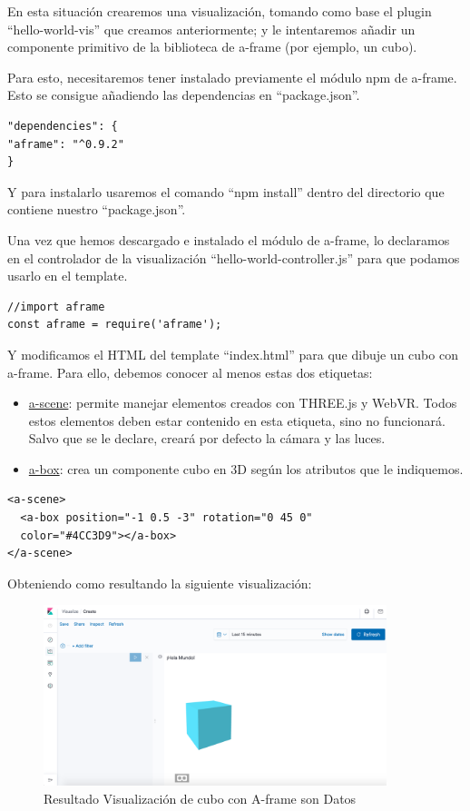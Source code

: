 \documentclass[a4paper, 12pt]{book}
\begin{document}
En esta situación crearemos una visualización, tomando como base el plugin “hello-world-vis” que creamos anteriormente; y le intentaremos añadir un componente primitivo de la biblioteca de a-frame (por ejemplo, un cubo).

Para esto, necesitaremos tener instalado previamente el módulo npm de a-frame. Esto se consigue añadiendo las dependencias en “package.json”.

\begin{lstlisting}[frame=single]
"dependencies": {
"aframe": "^0.9.2"
}
\end{lstlisting}

Y  para instalarlo usaremos el comando “npm install” dentro del directorio que contiene nuestro “package.json”.

Una vez que hemos descargado e instalado el módulo de a-frame, lo declaramos en el controlador de la visualización “hello-world-controller.js” para que podamos usarlo en el template.

\begin{lstlisting}[frame=single]
//import aframe
const aframe = require('aframe');
\end{lstlisting}

Y modificamos el HTML del template “index.html” para que dibuje un cubo con a-frame. Para ello, debemos conocer al menos estas dos etiquetas: 

\begin{itemize}
    \item \underline{a-scene}: permite manejar elementos creados con THREE.js y WebVR. Todos estos elementos deben estar contenido en esta etiqueta, sino no funcionará. Salvo que se le declare, creará por defecto la cámara y las luces.
    \item \underline{a-box}: crea un componente cubo en 3D según los atributos que le indiquemos.
\end{itemize}

\begin{lstlisting}[frame=single]
<a-scene>
  <a-box position="-1 0.5 -3" rotation="0 45 0"
  color="#4CC3D9"></a-box>
</a-scene>
\end{lstlisting}

Obteniendo como resultando la siguiente visualización:

\begin{figure}[H]
  \centering
  \includegraphics[width=10cm, keepaspectratio]{img/development/resultado-aframe-box.png}
  \caption{Resultado Visualización de cubo con A-frame son Datos}
  \label{fig:resultadoaframesindatos}
\end{figure}
\end{document}
